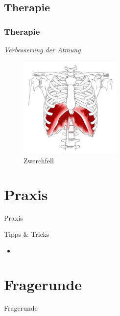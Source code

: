 \documentclass[xcolor=dvipsnames]{beamer}
\begin{document}
    \subsection{Therapie}
    \begin{frame}[allowframebreaks]
        \frametitle{Therapie}
        \textit{Verbesserung der Atmung}

        \begin{figure}
            \includegraphics[width=5cm]{../images/therapie_1.jpg}
            \caption{Zwerchfell}
        \end{figure}

    \end{frame}

    \section{Praxis}
    {
        \begin{frame}
            \begin{center}
                \Huge Praxis
            \end{center}
        \end{frame}
    }

    \begin{frame}{Tipps \& Tricks}
        \begin{itemize}
            \setlength\itemsep{1em}
            \item
        \end{itemize}
    \end{frame}

    \section{Fragerunde}
    {
        \begin{frame}
            \begin{center}
                \Huge Fragerunde
            \end{center}
        \end{frame}
    }
\end{document}
